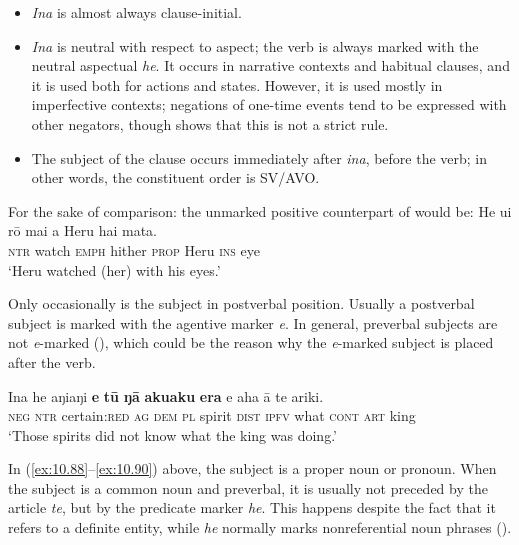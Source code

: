 \begin{itemize}
\item 
\textit{{\ꞌ}Ina} is almost always clause-initial.

\item 
\textit{{\ꞌ}Ina} is neutral with respect to aspect; the verb is always marked with the neutral aspectual \textit{he}. It occurs in narrative contexts and habitual clauses, and it is used both for actions and states. However, it is used mostly in imperfective contexts; negations of one-time events tend to be expressed with other negators, though  shows that this is not a strict rule. 

\item 
The subject of the clause occurs immediately after \textit{{\ꞌ}ina}, before the verb; in other words, the constituent order is SV/AVO. 

\end{itemize}

For the sake of comparison: the unmarked positive counterpart of  would be:
\ea\label{ex:10.88a}
\gll He u{\ꞌ}i rō mai a Heru hai mata.\\
\textsc{ntr} watch \textsc{emph} hither \textsc{prop} Heru \textsc{ins} eye\\

\glt 
‘Heru watched (her) with his eyes.’ \textstyleExampleref{[R313.165]} 
\z



Only occasionally is the subject in postverbal position. Usually a postverbal subject is marked with the agentive marker \textit{e}. In general, preverbal subjects are not \textit{e}{}-marked (), which could be the reason why the \textit{e}{}-marked subject is placed after the verb.

\ea\label{ex:10.93}
\gll {\ꞌ}Ina he aŋiaŋi \textbf{e} \textbf{tū} \textbf{ŋā} \textbf{{\ꞌ}aku{\ꞌ}aku} \textbf{era} e aha {\ꞌ}ā te {\ꞌ}ariki. \\
\textsc{neg} \textsc{ntr} certain:\textsc{red} \textsc{ag} \textsc{dem} \textsc{pl} spirit \textsc{dist} \textsc{ipfv} what \textsc{cont} \textsc{art} king \\

\glt
‘Those spirits did not know what the king was doing.’ \textstyleExampleref{[R532-06.018]}
\z

In (\ref{ex:10.88}–\ref{ex:10.90}) above, the subject is a proper noun or pronoun. When the subject is a common noun and preverbal, it is usually not preceded by the article \textit{te}, but by the predicate marker \textit{he}. This happens despite the fact that it refers to a definite entity, while \textit{he} normally marks nonreferential noun phrases ().

